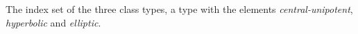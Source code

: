 The index set of the three class types, a type with the elements \emph{central-unipotent}, \emph{hyperbolic} and \emph{elliptic}.

